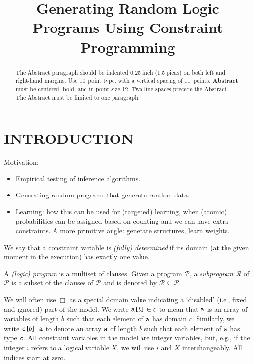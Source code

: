 \documentclass[letterpaper]{article}
\title{Generating Random Logic Programs Using Constraint Programming}
\author{} %
\theoremstyle{definition}
\newcommand{\variable}[1]{\texttt{\textup{#1}}}
\newcommand{\arrayd}[3]{\variable{{#1}[}{#2}\variable{]} \in {#3}}
\newcommand{\arrayt}[3]{\variable{{#3}[}{#2}\variable{] {#1}}}
\begin{document}

\maketitle

\begin{abstract}
The Abstract paragraph should be indented 0.25 inch (1.5 picas) on
both left and right-hand margins. Use 10~point type, with a vertical
spacing of 11~points.  {\bf Abstract} must be centered, bold, and in
point size 12. Two line spaces precede the Abstract. The Abstract must
be limited to one paragraph.
\end{abstract}

\section{INTRODUCTION}

Motivation:
\begin{itemize}
\item Empirical testing of inference algorithms.
\item Generating random programs that generate random data.
\item Learning: how this can be used for (targeted) learning, when (atomic)
  probabilities can be assigned based on counting and we can have extra
  constraints. A more primitive angle: generate structures, learn weights.
\end{itemize}


We say that a constraint variable is \emph{(fully) determined} if its domain (at
the given moment in the execution) has exactly one value.

A \emph{(logic) program} is a multiset of clauses. Given a program
$\mathscr{P}$, a \emph{subprogram} $\mathscr{R}$ of $\mathscr{P}$ is a subset of
the clauses of $\mathscr{P}$ and is denoted by $\mathscr{R} \subseteq
\mathscr{P}$.

We will often use $\Box$ as a special domain value indicating a `disabled'
(i.e., fixed and ignored) part of the model. We write $\arrayd{a}{b}{c}$ to mean
that $\variable{a}$ is an array of variables of length $b$ such that each
element of $\variable{a}$ has domain $c$. Similarly, we write $\arrayt{a}{b}{c}$
to denote an array $\variable{a}$ of length $b$ such that each element of
$\variable{a}$ has type $\variable{c}$. All constraint variables in the model
are integer variables, but, e.g., if the integer $i$ refers to a logical
variable $X$, we will use $i$ and $X$ interchangeably. All indices start at
zero.
\end{document}
